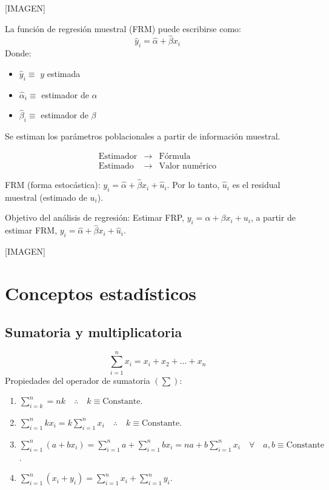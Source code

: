 \documentclass[
]{book}
\providecommand{\tightlist}{%
  \setlength{\itemsep}{0pt}\setlength{\parskip}{0pt}}
\begin{document}
{[}IMAGEN{]}

La función de regresión muestral (FRM) puede escribirse como:
\[
\hat y_i = \hat \alpha + \hat \beta x_i 
\]
Donde:

\begin{itemize}
\tightlist
\item
  \(\hat y_i \equiv\) \(y\) estimada
\item
  \(\hat \alpha_i \equiv\) estimador de \(\alpha\)
\item
  \(\hat \beta_i \equiv\) estimador de \(\beta\)
\end{itemize}

Se estiman los parámetros poblacionales a partir de información muestral.

\[
\begin{array}{ccc}
\text{Estimador} & \rightarrow & \text{Fórmula} \\
\text{Estimado} & \rightarrow & \text{Valor numérico}
\end{array}
\]

FRM (forma estocástica): \(y_i = \hat \alpha + \hat \beta x_i + \hat u_i\). Por lo tanto, \(\hat u_i\) es el residual muestral (estimado de \(u_i\)).

Objetivo del análisis de regresión: Estimar FRP, \(y_i = \alpha + \beta x_i + u_i\), a partir de estimar FRM, \(y_i = \hat \alpha + \hat \beta x_i + \hat u_i\).

{[}IMAGEN{]}

\hypertarget{conceptos-estaduxedsticos}{%
\section{Conceptos estadísticos}\label{conceptos-estaduxedsticos}}

\hypertarget{sumatoria-y-multiplicatoria}{%
\subsection{Sumatoria y multiplicatoria}\label{sumatoria-y-multiplicatoria}}

\[
\sum_{i=1}^n x_i = x_i + x_2 + \ldots + x_n
\]
Propiedades del operador de sumatoria \((\sum)\):

\begin{enumerate}
\def\labelenumi{\arabic{enumi}.}
\tightlist
\item
  \(\sum_{i=k}^n = nk \quad \therefore \quad k \equiv \text{Constante}\).
\item
  \(\sum_{i=1}^n k x_i = k\sum_{i=1}^nx_i \quad \therefore \quad k \equiv \text{Constante}\).
\item
  \(\sum_{i=1}^n (a+bx_i) = \sum_{i=1}^n a + \sum_{i=1}^n bx_i = na + b \sum_{i=1}^n x_i \quad \forall \quad a,b \equiv \text{Constante}\).
\item
  \(\sum_{i=1}^n (x_i + y_i) = \sum_{i=1}^nx_i + \sum_{i=1}^n y_i\).
\end{enumerate}
\end{document}
